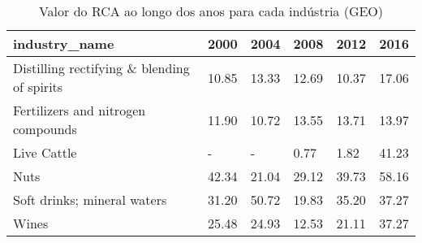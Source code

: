 \begin{table}
\centering
\caption{Valor do RCA ao longo dos anos para cada indústria (GEO)}
\begin{tabular}{p{6cm}p{1.5cm}p{1.5cm}p{1.5cm}p{1.5cm}p{1.5cm}}
\toprule
                              industry\_name &  2000 &  2004 &  2008 &  2012 &  2016 \\
\midrule
Distilling rectifying \& blending of spirits & 10.85 & 13.33 & 12.69 & 10.37 & 17.06 \\
         Fertilizers and nitrogen compounds & 11.90 & 10.72 & 13.55 & 13.71 & 13.97 \\
                                Live Cattle &     - &     - &  0.77 &  1.82 & 41.23 \\
                                       Nuts & 42.34 & 21.04 & 29.12 & 39.73 & 58.16 \\
                Soft drinks; mineral waters & 31.20 & 50.72 & 19.83 & 35.20 & 37.27 \\
                                      Wines & 25.48 & 24.93 & 12.53 & 21.11 & 37.27 \\
\bottomrule
\end{tabular}
\end{table}
